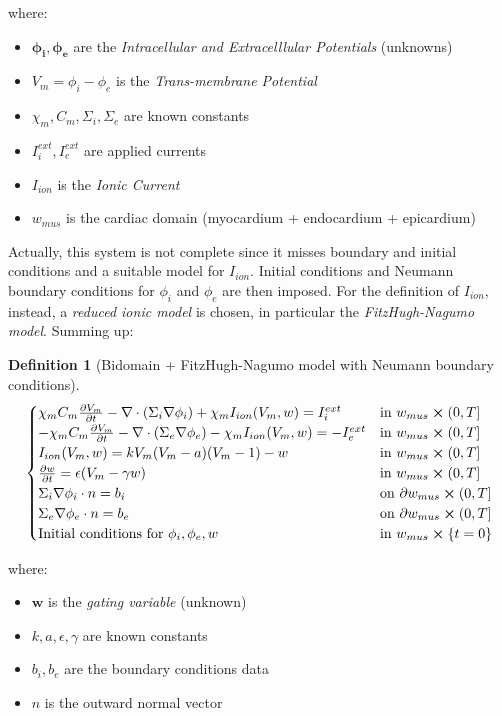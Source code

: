 \documentclass[a4paper,12pt]{article}
\newtheorem{definition}{Definition}
\begin{document}
	where:
	\begin{itemize}[label=\textendash]
		\item $\bm{\phi_i, \phi_e}$ are the \emph{Intracellular and Extracelllular Potentials} (unknowns)
		\item $V_m = \phi_i-\phi_e$ is the \emph{Trans-membrane Potential}
		\item $\chi_m,C_m, \Sigma_i, \Sigma_e$ are known constants
		\item $I_i^{ext},I_e^{ext}$ are applied currents
		\item $I_{ion}$ is the \emph{Ionic Current}
		\item $w_{mus}$ is the cardiac domain (myocardium + endocardium + epicardium)
	\end{itemize}
    
    \vspace{4mm}
    \noindent Actually, this system is not complete since it misses boundary and initial conditions and a suitable model for $I_{ion}$. Initial conditions and Neumann boundary conditions for $\phi_i$ and $\phi_e$ are then imposed. For the definition of $I_{ion}$, instead, a \emph{reduced ionic model} is chosen, in particular the \emph{FitzHugh-Nagumo model}. Summing up:
    
    \begin{definition}[Bidomain + FitzHugh-Nagumo model with Neumann boundary conditions]\label{def1}
    	\begin{equation*}
    	\begin{cases}
    	\chi_m C_m\pdv{V_m}{t} - \nabla \cdot (\Sigma_i \nabla \phi_i) + \chi_m I_{ion}(V_m,w) = I_i^{ext}    & \text{in } w_{mus} \cross (0,T]
    	\\
    	-\chi_m C_m\pdv{V_m}{t} - \nabla \cdot (\Sigma_e \nabla \phi_e) - \chi_m I_{ion}(V_m,w) = -I_e^{ext}    & \text{in } w_{mus} \cross (0,T]
    	\\
    	I_{ion}(V_m,w)=kV_m(V_m-a)(V_m-1)-w & \text{in } w_{mus} \cross (0,T]
    	\\
    	\pdv{w}{t} = \epsilon(V_m-\gamma w)  & \text{in } w_{mus} \cross (0,T]
    	\\
    	\Sigma_i\nabla \phi_i \cdot n = b_i   & \text{on } \partial w_{mus} \cross (0,T]
    	\\
    	\Sigma_e\nabla \phi_e \cdot n = b_e   & \text{on } \partial w_{mus} \cross (0,T]
    	\\
    	\text{Initial conditions for } \phi_i,\phi_e, w & \text{in } w_{mus}\cross\{t=0\}
    	\end{cases}
    	\end{equation*}
    \end{definition}
    \vspace{3mm}
    where:
    \begin{itemize}[label=\textendash]
    	\item $\bm{w}$ is the \emph{gating variable} (unknown)
    	\item $k,a,\epsilon,\gamma$ are known constants
    	\item $b_i,b_e$ are the boundary conditions data
    	\item $n$ is the outward normal vector
    \end{itemize}
\end{document}
